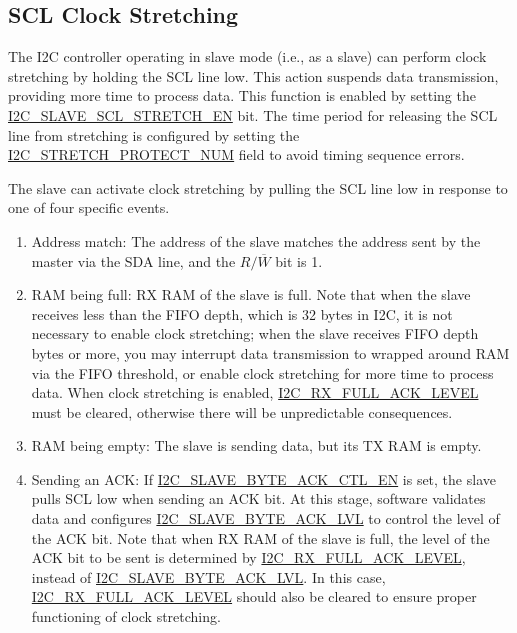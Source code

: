 \documentclass[main\_\_EN.tex]{subfiles}
\begin{document}
\subsection{SCL Clock Stretching}

The I2C controller operating in slave mode (i.e., as a slave) can perform clock stretching by holding the SCL line low. This action suspends data transmission, providing more time to process data. This function is enabled by setting the \hyperref[fielddesc:I2CSLAVESCLSTRETCHEN]{I2C\_SLAVE\_SCL\_STRETCH\_EN} bit. The time period for releasing the SCL line from stretching is configured by setting the \hyperref[fielddesc:I2CSTRETCHPROTECTNUM]{I2C\_STRETCH\_PROTECT\_NUM} field to avoid timing sequence errors.

The slave can activate clock stretching by pulling the SCL line low in response to one of four specific events.

\begin{enumerate}
\item Address match: The address of the slave matches the address sent by the master via the SDA line, and the $R/\overline W$ bit is 1.
\item RAM being full: RX RAM of the slave is full. Note that when the slave receives less than the FIFO depth, which is 32 bytes in \chipname{} I2C, it is not necessary to enable clock stretching; when the slave receives FIFO depth bytes or more, you may interrupt data transmission to wrapped around RAM via the FIFO threshold, or enable clock stretching for more time to process data. When clock stretching is enabled, \hyperref[fielddesc:I2CRXFULLACKLEVEL]{I2C\_RX\_FULL\_ACK\_LEVEL} must be cleared, otherwise there will be unpredictable consequences.
\item RAM being empty: The slave is sending data, but its TX RAM is empty.
\item Sending an ACK: If \hyperref[fielddesc:I2CSLAVEBYTEACKCTLEN]{I2C\_SLAVE\_BYTE\_ACK\_CTL\_EN} is set, the slave pulls SCL low when sending an ACK bit. At this stage, software validates data and configures \hyperref[fielddesc:I2CSLAVEBYTEACKLVL]{I2C\_SLAVE\_BYTE\_ACK\_LVL} to control the level of the ACK bit. Note that when RX RAM of the slave is full, the level of the ACK bit to be sent is determined by \hyperref[fielddesc:I2CRXFULLACKLEVEL]{I2C\_RX\_FULL\_ACK\_LEVEL}, instead of \hyperref[fielddesc:I2CSLAVEBYTEACKLVL]{I2C\_SLAVE\_BYTE\_ACK\_LVL}. In this case, \hyperref[fielddesc:I2CRXFULLACKLEVEL]{I2C\_RX\_FULL\_ACK\_LEVEL} should also be cleared to ensure proper functioning of clock stretching.
\end{enumerate}
\end{document}
